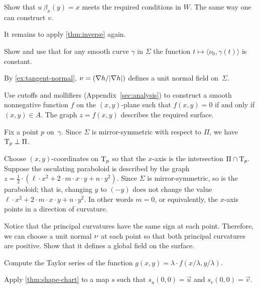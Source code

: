 Show that $u\:\beta_x(y)= x$ meets the required conditions in $W$.
The same way one can construct $v$.

It remains to apply \ref{thm:inverse} again.

Show and use that for any smooth curve $\gamma$ in $\Sigma$ the function $t\mapsto \langle\nu_0,\gamma(t)\rangle$ is constant.

By \ref{ex:tangent-normal}, $\nu=(\nabla h/|\nabla h|)$ defines a unit normal field on~$\Sigma$.

Use cutoffs and mollifiers (Appendix~\ref{sec:analysis}) to construct a smooth nonnegative function $f$ on the $(x,y)$-plane such that $f(x,y)=0$ if and only if $(x,y)\in A$.
The graph $z=f(x,y)$ describes the required surface.


\setcounter{eqtn}{0}

Fix a point $p$ on~$\gamma$.
Since $\Sigma$ is mirror-symmetric with respect to $\Pi$,
we have $\mathrm{T}_p\perp \Pi$.

Choose $(x,y)$-coordinates on $\mathrm{T}_p$ so that the $x$-axis is the intersection $\Pi\cap \mathrm{T}_p$.
Suppose the osculating paraboloid is described by the graph 
$z=\tfrac12\cdot(\ell\cdot x^2+2\cdot m\cdot x\cdot y+n\cdot y^2)$.
Since $\Sigma$ is mirror-symmetric, so is the paraboloid;
that is, changing $y$ to $(-y)$ does not change the value 
$\ell\cdot x^2+2\cdot m\cdot x\cdot y+n\cdot y^2$.
In other words $m=0$, or equivalently, the $x$-axis points in a direction of curvature.

Notice that the principal curvatures have the same sign at each point.
Therefore, we can choose a unit normal $\nu$ at each point so that both principal curvatures are positive.
Show that it defines a global field on the surface.


 Compute the Taylor series of the function $g(x,y)= \lambda \cdot f( x/ \lambda , y/\lambda)$.


Apply \ref{thm:shape-chart} to a map $s$ such that $s_u(0,0)=\vec u$ and $s_v(0,0)=\vec v$.

